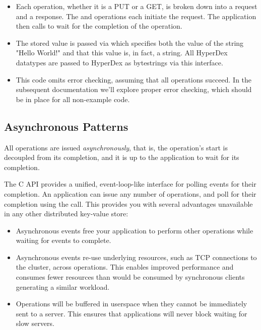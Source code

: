 \begin{itemize}
\item Each operation, whether it is a PUT or a GET, is broken down into a
request and a response.  The  and
 operations each initiate the request.  The
application then calls  to wait for the completion
of the operation.

\item The stored value is passed via 
which specifies both the value of the string "Hello World!" and that this value
is, in fact, a string.  All HyperDex datatypes are passed to HyperDex as
bytestrings via this interface.

\item This code omits error checking, assuming that all operations succeed.  In
the subsequent documentation we'll explore proper error checking, which should
be in place for all non-example code.
\end{itemize}

\subsection{Asynchronous Patterns}
\label{sec:api:c:client:async}

All operations are issued {\em asynchronously}, that is, the operation's start
is decoupled from its completion, and it is up to the application to wait for
its completion.

The C API provides a unified, event-loop-like interface for polling events for
their completion.  An application can issue any number of operations, and poll
for their completion using the  call.  This
provides you with several advantages unavailable in any other distributed
key-value store:

\begin{itemize}
\item Asynchronous events free your application to perform other operations
while waiting for events to complete.

\item Asynchronous events re-use underlying resources, such as TCP connections
to the cluster, across operations.  This enables improved performance and
consumes fewer resources than would be consumed by synchronous clients
generating a similar workload.

\item Operations will be buffered in userspace when they cannot be immediately
sent to a server.  This ensures that applications will never block waiting for
slow servers.
\end{itemize}

